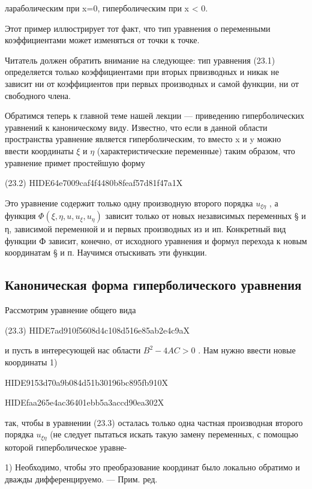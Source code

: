 \documentclass[
  ukrainian,
]{article}
\begin{document}
лараболическим при x=0, гиперболическим при x \textless{} 0.

Этот пример иллюстрирует тот факт, что тип уравнения о переменными
коэффициентами может изменяться от точки к точке.

Читатель должен обратить внимание на следующее: тип уравнения (23.1)
определяется только коэффициентами при вторых првизводных и никак не
зависит ни от коэффициентов при первых производных и самой функции, ни
от свободного члена.

Обратимся теперь к главной теме нашей лекции --- приведению
гиперболических уравнений к каноническому виду. Известно, что если в
данной области пространства уравнение является гиперболическим, то
вместо x и y можно ввести координаты \(\xi\) и \(\eta\)
(характеристические переменные) таким образом, что уравнение примет
простейшую форму

(23.2) HIDE64e7009caf4f4480b8feaf57d81f47a1X

Это уравнение содержит только одну производную второго порядка
\(u_{\xi\eta}\) , а функция \(\Phi(\xi,\eta,u,u_{\xi},u_{\eta})\)
зависит только от новых независимых переменных § и η, зависимой
переменной и и первых производных из и ип. Конкретный вид функции Ф
зависит, конечно, от исходного уравнения и формул перехода к новым
координатам § и п. Научимся отыскивать эти функции.

\subsection{Каноническая форма гиперболического
уравнения}\label{ux43aux430ux43dux43eux43dux438ux447ux435ux441ux43aux430ux44f-ux444ux43eux440ux43cux430-ux433ux438ux43fux435ux440ux431ux43eux43bux438ux447ux435ux441ux43aux43eux433ux43e-ux443ux440ux430ux432ux43dux435ux43dux438ux44f}

Рассмотрим уравнение общего вида

(23.3) HIDE7ad910f5608d4c108d516e85ab2e4c9aX

и пусть в интересующей нас области \(B^2 - 4AC > 0\) . Нам нужно ввести
новые координаты 1)

HIDE9153d70a9b084d51b30196bc895fb910X

HIDEfaa265e4ac36401ebb5a3accd90ea302X

так, чтобы в уравнении (23.3) осталась только одна частная производная
второго порядка \(u_{\xi\eta}\) (не следует пытаться искать такую замену
переменных, с помощью которой гиперболическое уравне-

1) Необходимо, чтобы это преобразование координат было локально обратимо
и дважды дифференцируемо. --- Прим. ред.
\end{document}
